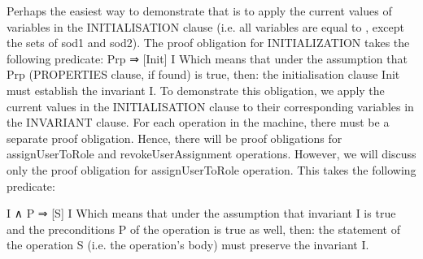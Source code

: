       Perhaps the easiest way to demonstrate that is to apply the current values of variables in the INITIALISATION clause (i.e. all variables are equal to { }, except the sets of sod1 and sod2).  
      The proof obligation for INITIALIZATION takes the following predicate: 
Prp ⇒ [Init] I
      Which means that under the assumption that Prp (PROPERTIES clause, if found) is true, then: the initialisation clause Init must establish the invariant I.  To demonstrate this obligation, we apply the current values in the INITIALISATION clause to their corresponding variables in the INVARIANT clause.
      For each operation in the machine, there must be a separate proof obligation.  Hence, there will be proof obligations for assignUserToRole and revokeUserAssignment operations.  However, we will discuss only the proof obligation for assignUserToRole operation.  This takes the following predicate: 

I ∧ P ⇒ [S] I
      Which means that under the assumption that invariant I is true and the preconditions P of the operation is true as well, then: the statement of the operation S (i.e. the operation’s body) must preserve the invariant I.
